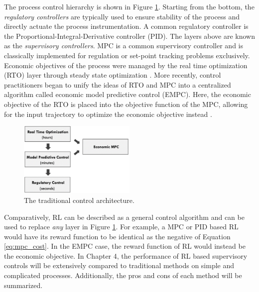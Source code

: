 The process control hierarchy is shown in Figure \ref{fig:rto_mpc_pid}. Starting from the bottom, the \textit{regulatory controllers} are typically used to ensure stability of the process and directly actuate the process instrumentation.  A common regulatory controller is the Proportional-Integral-Derivative controller (PID). The layers above are known as the \textit{supervisory controllers}. MPC is a common supervisory controller and is classically implemented for regulation or set-point tracking problems exclusively.  Economic objectives of the process were managed by the real time optimization (RTO) layer through steady state optimization \cite{rto}. More recently, control practitioners began to unify the ideas of RTO and MPC into a centralized algorithm called economic model predictive control (EMPC).  Here, the economic objective of the RTO is placed into the objective function of the MPC, allowing for the input trajectory to optimize the economic objective instead \cite{empc2, empc1}. 

\begin{figure}[H]
    \centering
    \includegraphics[width=0.5\textwidth]{images/ch1/rto_mpc_pid.jpeg}
    \caption{The traditional control architecture.}
    \label{fig:rto_mpc_pid}
\end{figure}

Comparatively, RL can be described as a general control algorithm and can be used to replace \textit{any} layer in Figure \ref{fig:rto_mpc_pid}. For example, a MPC or PID based RL would have its reward function to be identical as the negative of Equation \ref{eq:mpc_cost}.  In the EMPC case, the reward function of RL would instead be the economic objective.  In Chapter 4, the performance of RL based supervisory controls will be extensively compared to traditional methods on simple and complicated processes. Additionally, the pros and cons of each method will be summarized.